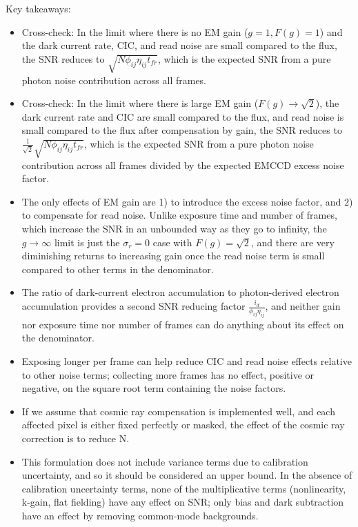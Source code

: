 \documentclass{article}
\begin{document}
Key takeaways:
\begin{itemize}
\item Cross-check: In the limit where there is no EM gain ($g = 1, F(g) = 1$) and the dark current rate, CIC, and read noise are small compared to the flux, the SNR reduces to $\sqrt{N \phi_{ij} \eta_{ij} t_{fr}}$, which is the expected SNR from a pure photon noise contribution across all frames.
\item Cross-check: In the limit where there is large EM gain ($F(g) \rightarrow \sqrt{2}$), the dark current rate and CIC are small compared to the flux, and read noise is small compared to the flux after compensation by gain, the SNR reduces to $\frac{1}{\sqrt{2}}\sqrt{N \phi_{ij} \eta_{ij} t_{fr}}$, which is the expected SNR from a pure photon noise contribution across all frames divided by the expected EMCCD excess noise factor.
\item The only effects of EM gain are 1) to introduce the excess noise factor, and 2) to compensate for read noise.   Unlike exposure time and number of frames, which increase the SNR in an unbounded way as they go to infinity, the $g \rightarrow \infty$ limit is just the $\sigma_{r} = 0$ case with $F(g) = \sqrt{2}$, and there are very diminishing returns to increasing gain once the read noise term is small compared to other terms in the denominator.
\item The ratio of dark-current electron accumulation to photon-derived electron accumulation provides a second SNR reducing factor $\frac{i_{d}}{\phi_{ij} \eta_{ij}}$, and neither gain nor exposure time nor number of frames can do anything about its effect on the denominator.
\item Exposing longer per frame can help reduce CIC and read noise effects relative to other noise terms; collecting more frames has no effect, positive or negative, on the square root term containing the noise factors.
\item If we assume that cosmic ray compensation is implemented well, and each affected pixel is either fixed perfectly or masked, the effect of the cosmic ray correction is to reduce N.
\item This formulation does not include variance terms due to calibration uncertainty, and so it should be considered an upper bound.  In the absence of calibration uncertainty terms, none of the multiplicative terms (nonlinearity, k-gain, flat fielding) have any effect on SNR; only bias and dark subtraction have an effect by removing common-mode backgrounds.
\end{itemize}
\end{document}
